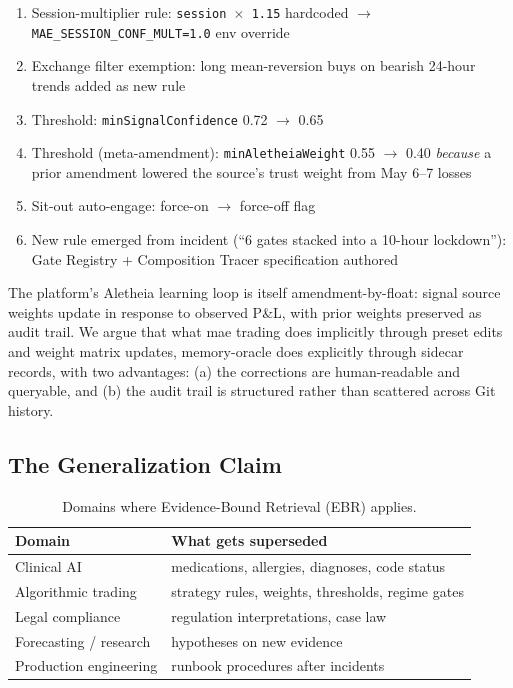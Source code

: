 \documentclass[runningheads]{llncs}
\begin{document}
\begin{enumerate}
  \item Session-multiplier rule: \texttt{session $\times$ 1.15} hardcoded
        $\rightarrow$ \texttt{MAE\_SESSION\_CONF\_MULT=1.0} env override
  \item Exchange filter exemption: long mean-reversion buys on bearish
        24-hour trends added as new rule
  \item Threshold: \texttt{minSignalConfidence} 0.72 $\rightarrow$ 0.65
  \item Threshold (meta-amendment):
        \texttt{minAletheiaWeight} 0.55 $\rightarrow$ 0.40
        \emph{because} a prior amendment lowered the source's trust weight
        from May 6--7 losses
  \item Sit-out auto-engage: force-on $\rightarrow$ force-off flag
  \item New rule emerged from incident (``6 gates stacked into a 10-hour
        lockdown''): Gate Registry + Composition Tracer specification authored
\end{enumerate}

The platform's Aletheia learning loop is itself amendment-by-float: signal
source weights update in response to observed P\&L, with prior weights
preserved as audit trail. We argue that what mae trading does implicitly
through preset edits and weight matrix updates, memory-oracle does explicitly
through sidecar records, with two advantages: (a) the corrections are
human-readable and queryable, and (b) the audit trail is structured rather
than scattered across Git history.

\subsection{The Generalization Claim}

\begin{table}[h]
\centering
\caption{Domains where Evidence-Bound Retrieval (EBR) applies.}
\label{tab:generalization}
\begin{tabular}{ll}
\toprule
\textbf{Domain} & \textbf{What gets superseded} \\
\midrule
Clinical AI & medications, allergies, diagnoses, code status \\
Algorithmic trading & strategy rules, weights, thresholds, regime gates \\
Legal compliance & regulation interpretations, case law \\
Forecasting / research & hypotheses on new evidence \\
Production engineering & runbook procedures after incidents \\
\bottomrule
\end{tabular}
\end{table}
\end{document}
